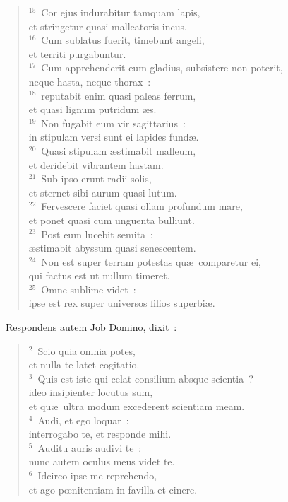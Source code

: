\begin{flushleft}
\begin{verse}
${}^{15}$~Cor ejus indurabitur tamquam lapis,\\ et stringetur quasi malleatoris incus.\\
${}^{16}$~Cum sublatus fuerit, timebunt angeli,\\ et territi purgabuntur.\\
${}^{17}$~Cum apprehenderit eum gladius, subsistere non poterit,\\ neque hasta, neque thorax~:\\
${}^{18}$~reputabit enim quasi paleas ferrum,\\ et quasi lignum putridum \ae s.\\
${}^{19}$~Non fugabit eum vir sagittarius~:\\ in stipulam versi sunt ei lapides fund\ae .\\
${}^{20}$~Quasi stipulam \ae stimabit malleum,\\ et deridebit vibrantem hastam.\\
${}^{21}$~Sub ipso erunt radii solis,\\ et sternet sibi aurum quasi lutum.\\
${}^{22}$~Fervescere faciet quasi ollam profundum mare,\\ et ponet quasi cum unguenta bulliunt.\\
${}^{23}$~Post eum lucebit semita~:\\ \ae stimabit abyssum quasi senescentem.\\
${}^{24}$~Non est super terram potestas qu\ae\ comparetur ei,\\ qui factus est ut nullum timeret.\\
${}^{25}$~Omne sublime videt~:\\ ipse est rex super universos filios superbi\ae .\end{verse}\end{flushleft}


~\lettrine[lines=10,image=true,loversize=0.05,lraise=-0.03]{R}{}espondens autem Job Domino, dixit~:
\begin{flushleft}\begin{verse}\vspace{6pt}${}^{2}$~Scio quia omnia potes,\\ et nulla te latet cogitatio.\\
${}^{3}$~Quis est iste qui celat consilium absque scientia~?\\ ideo insipienter locutus sum,\\ et qu\ae\ ultra modum excederent scientiam meam.\\
${}^{4}$~Audi, et ego loquar~:\\ interrogabo te, et responde mihi.\\
${}^{5}$~Auditu auris audivi te~:\\ nunc autem oculus meus videt te.\\
${}^{6}$~Idcirco ipse me reprehendo,\\ et ago pœnitentiam in favilla et cinere.\end{verse}\end{flushleft}


